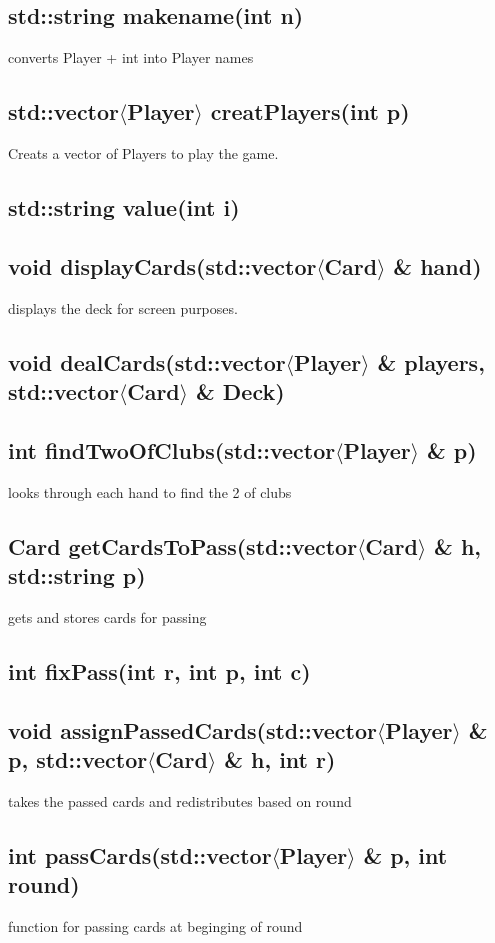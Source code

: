 \documentclass[]{scrartcl}
\begin{document}
\subsection{std::string makename(int n) } 
	converts Player + int into Player names
\subsection{std::vector$\langle$Player$\rangle$  creatPlayers(int p) } 
	Creats a vector of Players to play the game.
\subsection{std::string value(int i)}
\subsection{void displayCards(std::vector$\langle$Card$\rangle$ \& hand)}
	displays the deck for screen purposes.
\subsection{void dealCards(std::vector$\langle$Player$\rangle$ \& players, std::vector$\langle$Card$\rangle$ \& Deck)}
\subsection{int findTwoOfClubs(std::vector$\langle$Player$\rangle$ \& p)}  
	looks through each hand to find the 2 of clubs
\subsection{Card getCardsToPass(std::vector$\langle$Card$\rangle$ \& h, std::string p) }
	gets and stores cards for passing
\subsection{int fixPass(int r, int p, int c)}
\subsection{void assignPassedCards(std::vector$\langle$Player$\rangle$ \& p, std::vector$\langle$Card$\rangle$ \& h, int r)  }
	takes the passed cards and redistributes based on round
\subsection{int passCards(std::vector$\langle$Player$\rangle$ \& p, int round)  }
	function for passing cards at beginging of round
\end{document}
